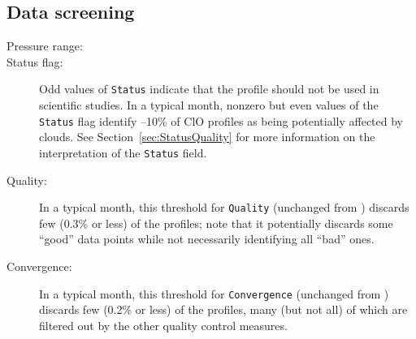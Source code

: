 \begin{nofloatpages}
\subsection{Data screening}
\label{sec:ClOScreening}
\begin{description}
  \item[Pressure range:]  \standardrangestatement

    \standardprecisionrule

  \item[Status flag:] 

    Odd values of \texttt{Status} indicate that the profile should not be used in scientific studies. In a typical month, nonzero but even values of the \texttt{Status} flag identify --10\% of ClO profiles as being potentially affected by clouds. See Section~\ref{sec:StatusQuality} for more information on the interpretation of the \texttt{Status} field.

  \item[Quality:] 

    In a typical month, this threshold for \texttt{Quality} (unchanged from \prevv) discards few (0.3\% or less) of the  profiles; note that it potentially discards some ``good'' data points while not necessarily identifying all ``bad'' ones.

  \item[Convergence:] 

    In a typical month, this threshold for \texttt{Convergence} (unchanged from \prevv) discards few (0.2\% or less) of the  profiles, many (but not all) of which are filtered out by the other quality control measures.


\end{description}
\end{nofloatpages}
